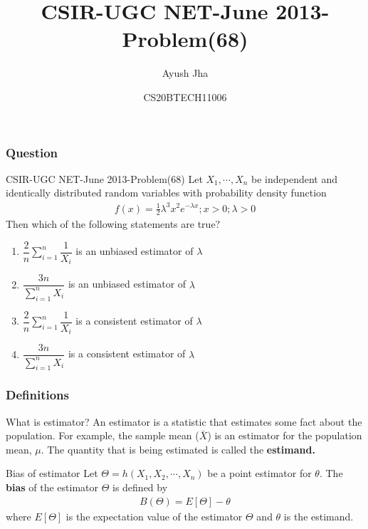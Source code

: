 \documentclass{beamer}
\title{CSIR-UGC NET-June 2013-Problem(68)}
\author{Ayush Jha}
\date{CS20BTECH11006}
\begin{document}
\begin{frame}
\titlepage
\end{frame}

\begin{frame}
\frametitle{Question}
\begin{block}{CSIR-UGC NET-June 2013-Problem(68)}
Let $ X_1, \cdots , X_n $ be independent and identically distributed random variables with probability density function
\begin{align*}
    f(x) = \frac{1}{2} \lambda^3x^2e^{-\lambda x} ; x>0 ; \lambda > 0
\end{align*}
Then which of the following statements are true?
\begin{enumerate}
    \item $\dfrac{2}{n} \sum_{i=1}^{n} \dfrac{1}{X_i} $ is an unbiased estimator of $ \lambda$
    \item $\dfrac{3n}{\sum_{i=1}^{n} X_i } $ is an unbiased estimator of $ \lambda$ \\
    \item $\dfrac{2}{n} \sum_{i=1}^{n} \dfrac{1}{X_i} $ is a consistent estimator of $ \lambda$
    \item $\dfrac{3n}{\sum_{i=1}^{n} X_i } $ is a consistent estimator of $ \lambda$
\end{enumerate}
\end{block}
\end{frame}

\begin{frame}
\frametitle{Definitions}
\begin{block}{What is estimator?}
An estimator is a statistic that estimates some fact about the population. For example, the sample mean ($\bar{X}$) is an estimator for the population mean, $ \mu$.
The quantity that is being estimated is called the \textbf{estimand.} 
\end{block}
\begin{block}{Bias of estimator}
Let $ \Theta = h(X_1,X_2, \cdots, X_n) $  be a point estimator for $ \theta$. The \textbf{bias} of the estimator $ \Theta $ is defined by 
\begin{align}
    B(\Theta ) = E[\Theta ] - \theta
\end{align}
where $ E[\Theta ]$ is the expectation value of the estimator $ \Theta $ and $ \theta$ is the estimand. 
\end{block}
\end{frame}
\end{document}
